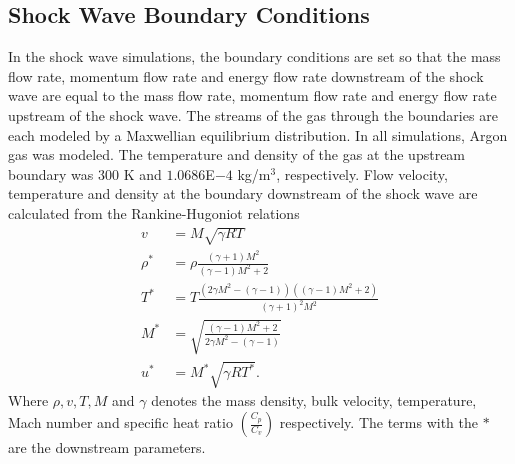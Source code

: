 \subsection{Shock Wave Boundary Conditions}
In the shock wave simulations, the boundary conditions are set so that the mass flow rate, momentum flow rate and energy flow rate downstream of the shock wave are equal to the mass flow rate, momentum flow rate and energy flow rate upstream of the shock wave. The streams of the gas through the boundaries are each modeled by a Maxwellian equilibrium distribution. In all simulations, Argon gas was modeled. The temperature and density of the gas at the upstream boundary was $300$ K and $1.0686$E${-}4$ kg/m${}^{3}$, respectively. Flow velocity, temperature and density at the boundary downstream of the shock wave are calculated from the Rankine-Hugoniot relations \cite{roshko}
%
\begin{align*}
v &= M \sqrt{\gamma R T}\\
\rho^* &= \rho \frac{(\gamma+1) M^2}{(\gamma-1) M^2+2}\\
T^* &= T \frac{(2 \gamma M^2-(\gamma-1)) ((\gamma-1) M^2+2)}{(\gamma+1)^2 M^2}\\
M^* &= \sqrt{\frac{(\gamma-1) M^2+2}{2 \gamma M^2-(\gamma-1)}}\\
u^* &= M^* \sqrt{\gamma R T^*}.
\end{align*}
%
Where $\rho,v,T,M$ and $\gamma$ denotes the mass density, bulk velocity, temperature, Mach number and specific heat ratio $(\frac{C_p}{C_v})$ respectively. The terms with the $*$ are the downstream parameters.

